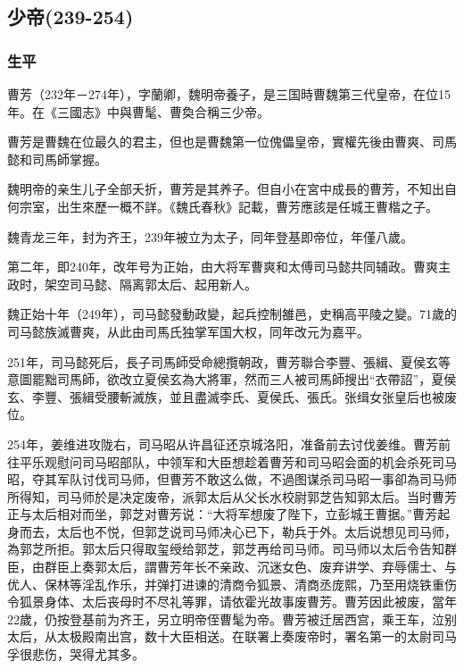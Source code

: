 
\subsection{少帝\tiny(239-254)}

\subsubsection{生平}

曹芳（232年－274年），字蘭卿，魏明帝養子，是三国時曹魏第三代皇帝，在位15年。在《三國志》中與曹髦、曹奐合稱三少帝。

曹芳是曹魏在位最久的君主，但也是曹魏第一位傀儡皇帝，實權先後由曹爽、司馬懿和司馬師掌握。

魏明帝的亲生儿子全部夭折，曹芳是其养子。但自小在宮中成長的曹芳，不知出自何宗室，出生來歷一概不詳。《魏氏春秋》記載，曹芳應該是任城王曹楷之子。

魏青龙三年，封为齐王，239年被立为太子，同年登基即帝位，年僅八歲。

第二年，即240年，改年号为正始，由大将军曹爽和太傅司马懿共同辅政。曹爽主政时，架空司马懿、隔离郭太后、起用新人。

魏正始十年（249年），司马懿發動政變，起兵控制雒邑，史稱高平陵之變。71歲的司马懿族滅曹爽，从此由司馬氏独掌军国大权，同年改元为嘉平。

251年，司马懿死后，長子司馬師受命總攬朝政，曹芳聯合李豐、張緝、夏侯玄等意圖罷黜司馬師，欲改立夏侯玄為大將軍，然而三人被司馬師搜出“衣帶詔”，夏侯玄、李豐、張緝受腰斬滅族，並且盡滅李氏、夏侯氏、張氏。张缉女张皇后也被废位。

254年，姜维进攻陇右，司马昭从许昌征还京城洛阳，准备前去讨伐姜维。曹芳前往平乐观慰问司马昭部队，中领军和大臣想趁着曹芳和司马昭会面的机会杀死司马昭，夺其军队讨伐司马师，但曹芳不敢这么做，不過图谋杀司马昭一事卻為司马师所得知，司马师於是决定废帝，派郭太后从父长水校尉郭芝告知郭太后。当时曹芳正与太后相对而坐，郭芝对曹芳说：“大将军想废了陛下，立彭城王曹据。”曹芳起身而去，太后也不悦，但郭芝说司马师决心已下，勒兵于外。太后说想见司马师，為郭芝所拒。郭太后只得取玺绶给郭芝，郭芝再给司马师。司马师以太后令告知群臣，由群臣上奏郭太后，謂曹芳年长不亲政、沉迷女色、废弃讲学、弃辱儒士、与优人、保林等淫乱作乐，并弹打进谏的清商令狐景、清商丞庞熙，乃至用烧铁重伤令狐景身体、太后丧母时不尽礼等罪，请依霍光故事废曹芳。曹芳因此被废，當年22歲，仍按登基前为齐王，另立明帝侄曹髦为帝。曹芳被迁居西宫，乘王车，泣别太后，从太极殿南出宫，数十大臣相送。在联署上奏废帝时，署名第一的太尉司马孚很悲伤，哭得尤其多。

